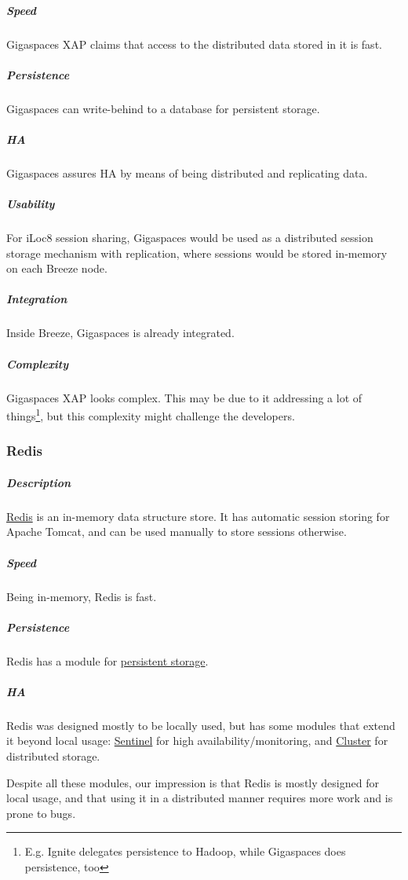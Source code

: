 \documentclass{article}
\begin{document}
	\subparagraph*{Speed}
	
	Gigaspaces XAP claims that access to the distributed data stored in it is fast.
	
	\subparagraph*{Persistence}
	
	Gigaspaces can write-behind to a database for persistent storage.
	
	\subparagraph*{HA}
	
	Gigaspaces assures HA by means of being distributed and replicating data.
	
	\subparagraph*{Usability}
	
	For iLoc8 session sharing, Gigaspaces would be used as a distributed session storage mechanism with replication, where sessions would be stored in-memory on each Breeze node.
	
	\subparagraph*{Integration}
	
	Inside Breeze, Gigaspaces is already integrated.
	
	\subparagraph*{Complexity}
	
	Gigaspaces XAP looks complex. This may be due to it addressing a lot of things\footnote{E.g. Ignite delegates persistence to Hadoop, while Gigaspaces does persistence, too}, but this complexity might challenge the developers. 
	
	\subsubsection{Redis}
	
	\subparagraph*{Description}
	
	\href{http://redis.io}{Redis} is an in-memory data structure store. It has automatic session storing for Apache Tomcat, and can be used manually to store sessions otherwise.
	
	\subparagraph*{Speed}
	
	Being in-memory, Redis is fast.
	
	\subparagraph*{Persistence}
	
	Redis has a module for \href{http://redis.io/topics/persistence}{persistent storage}.
	
	\subparagraph*{HA}
	
	Redis was designed mostly to be locally used, but has some modules that extend it beyond local usage: \href{http://redis.io/topics/sentinel}{Sentinel} for high availability/monitoring, and \href{http://redis.io/topics/cluster-tutorial}{Cluster} for distributed storage.

	Despite all these modules, our impression is that Redis is mostly designed for local usage, and that using it in a distributed manner requires more work and is prone to bugs.
	
\end{document}
